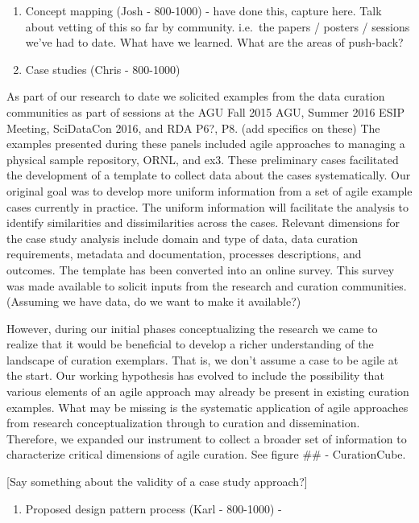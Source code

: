 \documentclass[paper]{ijdc-v9}
\begin{document}
\begin{enumerate}
\def\labelenumi{\arabic{enumi}.}
\item
  Concept mapping (Josh - 800-1000) - have done this, capture here. Talk
  about vetting of this so far by community. i.e.~the papers / posters /
  sessions we've had to date. What have we learned. What are the areas
  of push-back?
\item
  Case studies (Chris - 800-1000)
\end{enumerate}

As part of our research to date we solicited examples from the data
curation communities as part of sessions at the AGU Fall 2015 AGU,
Summer 2016 ESIP Meeting, SciDataCon 2016, and RDA P6?, P8. (add
specifics on these) The examples presented during these panels included
agile approaches to managing a physical sample repository, ORNL, and
ex3. These preliminary cases facilitated the development of a template
to collect data about the cases systematically. Our original goal was to
develop more uniform information from a set of agile example cases
currently in practice. The uniform information will facilitate the
analysis to identify similarities and dissimilarities across the cases.
Relevant dimensions for the case study analysis include domain and type
of data, data curation requirements, metadata and documentation,
processes descriptions, and outcomes. The template has been converted
into an online survey. This survey was made available to solicit inputs
from the research and curation communities. (Assuming we have data, do
we want to make it available?)

However, during our initial phases conceptualizing the research we came
to realize that it would be beneficial to develop a richer understanding
of the landscape of curation exemplars. That is, we don't assume a case
to be agile at the start. Our working hypothesis has evolved to include
the possibility that various elements of an agile approach may already
be present in existing curation examples. What may be missing is the
systematic application of agile approaches from research
conceptualization through to curation and dissemination. Therefore, we
expanded our instrument to collect a broader set of information to
characterize critical dimensions of agile curation. See figure \#\# -
CurationCube.

{[}Say something about the validity of a case study approach?{]}

\begin{enumerate}
\def\labelenumi{\arabic{enumi}.}
\setcounter{enumi}{2}
\itemsep1pt\parskip0pt
\item
  Proposed design pattern process (Karl - 800-1000) -
\end{enumerate}
\end{document}
